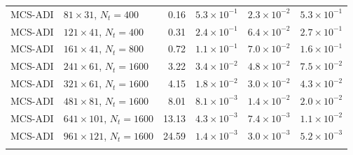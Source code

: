 \begin{table}[h]
\begin{tabular}{llrccc}
\addlinespace[2pt]
MCS-ADI & $81\times31$, $N_t=400$ & 0.16 & $5.3\times10^{-1}$ & $2.3\times10^{-2}$ & $5.3\times10^{-1}$\\
MCS-ADI & $121\times41$, $N_t=400$ & 0.31 & $2.4\times10^{-1}$ & $6.4\times10^{-2}$ & $2.7\times10^{-1}$\\
MCS-ADI & $161\times41$, $N_t=800$ & 0.72 & $1.1\times10^{-1}$ & $7.0\times10^{-2}$ & $1.6\times10^{-1}$\\
MCS-ADI & $241\times61$, $N_t=1600$ & 3.22 & $3.4\times10^{-2}$ & $4.8\times10^{-2}$ & $7.5\times10^{-2}$\\
MCS-ADI & $321\times61$, $N_t=1600$ & 4.15 & $1.8\times10^{-2}$ & $3.0\times10^{-2}$ & $4.3\times10^{-2}$\\
MCS-ADI & $481\times81$, $N_t=1600$ & 8.01 & $8.1\times10^{-3}$ & $1.4\times10^{-2}$ & $2.0\times10^{-2}$\\
MCS-ADI & $641\times101$, $N_t=1600$ & 13.13 & $4.3\times10^{-3}$ & $7.4\times10^{-3}$ & $1.1\times10^{-2}$\\
MCS-ADI & $961\times121$, $N_t=1600$ & 24.59 & $1.4\times10^{-3}$ & $3.0\times10^{-3}$ & $5.2\times10^{-3}$\\
\addlinespace[2pt]
\bottomrule
\end{tabular}
\end{table}
